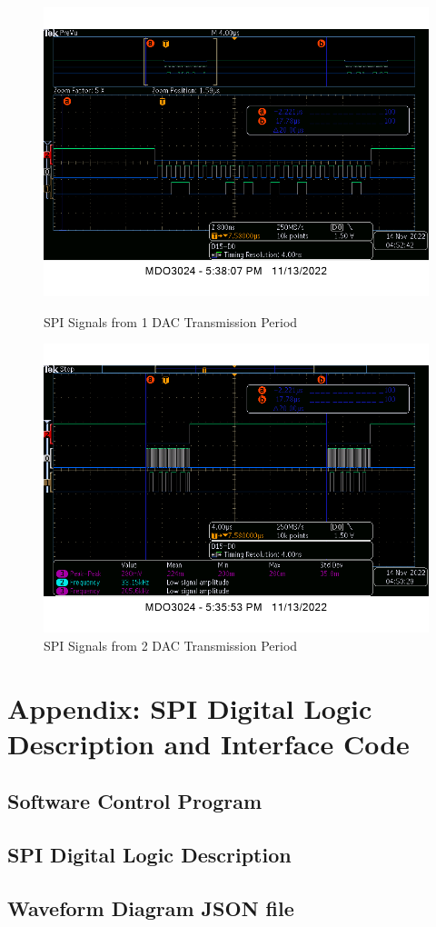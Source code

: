 \documentclass[conference]{IEEEtran}
\begin{document}
\begin{figure}[!ht]
    \centerline{\includegraphics[width=0.7\linewidth]{Figures/SPI/dac_dig_one_cycle.png}}
    \caption{SPI Signals from 1 DAC Transmission Period}
    \label{DAC_1}
    \centerline{\includegraphics[width=0.7\linewidth]{Figures/SPI/dac_dig_two_cycle.png}}
    \caption{SPI Signals from 2 DAC Transmission Period}
    \label{DAC_2}
\end{figure}
\clearpage

\section{Appendix: SPI Digital Logic Description and Interface Code}
\subsection{Software Control Program}

\clearpage
\subsection{SPI Digital Logic Description}

\clearpage
\subsection{Waveform Diagram JSON file}

\end{document}
